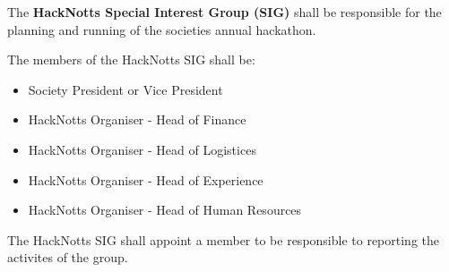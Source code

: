 \begin{clause}
    The \textbf{HackNotts Special Interest Group (SIG)} shall be responsible for the planning and running of the societies annual hackathon.
\end{clause}

\begin{subclause}
    The members of the HackNotts SIG shall be:
    \begin{itemize}
        \item Society President or Vice President
        \item HackNotts Organiser - Head of Finance
        \item HackNotts Organiser - Head of Logistices
        \item HackNotts Organiser - Head of Experience
        \item HackNotts Organiser - Head of Human Resources
    \end{itemize}
\end{subclause}

\begin{subclause}
    The HackNotts SIG shall appoint a member to be responsible to reporting the activites of the group.
\end{subclause}
